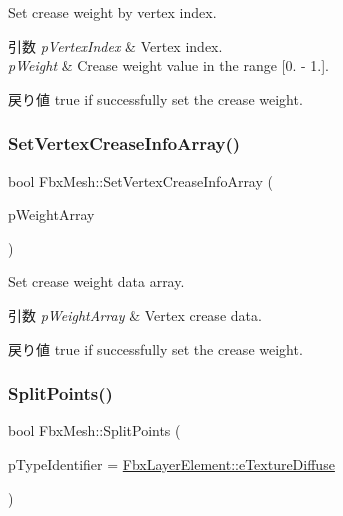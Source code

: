 Set crease weight by vertex index. 
\begin{DoxyParams}{引数}
{\em p\+Vertex\+Index} & Vertex index. \\
\hline
{\em p\+Weight} & Crease weight value in the range \mbox{[}0. -\/ 1.\mbox{]}. \\
\hline
\end{DoxyParams}
\begin{DoxyReturn}{戻り値}
{\ttfamily true} if successfully set the crease weight. 
\end{DoxyReturn}
\mbox{\label{class_fbx_mesh_aef55378b9360b005b736c5e67d19041e}} 
\subsubsection{\texorpdfstring{Set\+Vertex\+Crease\+Info\+Array()}{SetVertexCreaseInfoArray()}}
{\footnotesize\ttfamily bool Fbx\+Mesh\+::\+Set\+Vertex\+Crease\+Info\+Array (\begin{DoxyParamCaption}\item[{\hyperlink{class_fbx_array}{Fbx\+Array}$<$ double $>$ $\ast$}]{p\+Weight\+Array }\end{DoxyParamCaption})}

Set crease weight data array. 
\begin{DoxyParams}{引数}
{\em p\+Weight\+Array} & Vertex crease data. \\
\hline
\end{DoxyParams}
\begin{DoxyReturn}{戻り値}
{\ttfamily true} if successfully set the crease weight. 
\end{DoxyReturn}
\mbox{\label{class_fbx_mesh_a3b2104f5d0942fd1e74bc62ec1bc4d52}} 
\subsubsection{\texorpdfstring{Split\+Points()}{SplitPoints()}}
{\footnotesize\ttfamily bool Fbx\+Mesh\+::\+Split\+Points (\begin{DoxyParamCaption}\item[{\hyperlink{class_fbx_layer_element_a8c95c5cd880b56c776acd379bd86f42c}{Fbx\+Layer\+Element\+::\+E\+Type}}]{p\+Type\+Identifier = {\ttfamily \hyperlink{class_fbx_layer_element_a8c95c5cd880b56c776acd379bd86f42ca09829e6ecf512e7ae04d9ad8de1342fa}{Fbx\+Layer\+Element\+::e\+Texture\+Diffuse}} }\end{DoxyParamCaption})}

